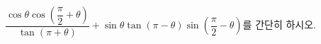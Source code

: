 $\dfrac{\cos\theta\cos\left(\dfrac{\pi}{2}+\theta\right)}{\tan(\pi+\theta)}+\sin\theta\tan(\pi-\theta)\sin\left(\dfrac{\pi}{2}-\theta\right)$를 간단히 하시오.
